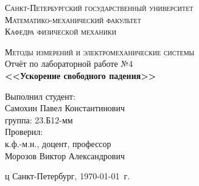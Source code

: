\begin{titlepage}
\begin{center}
\textsc{Санкт-Петербургский государственный университет\\
Математико-механический факультет\\
Кафедра физической механики\\}

\vfill

\textsc{Методы измерений и электромеханические системы\\[3mm]}
Отчёт по лабораторной работе №4\\[6mm]


\textbf{\large<<Ускорение свободного падения>>}

\vfill
\end{center}

\hfill
\begin{minipage}{.5\textwidth}
Выполнил студент:\\[2mm] 
Самохин Павел Константинович\\
группа: 23.Б12-мм\\[5mm]

Проверил:\\[2mm] 
к.ф.-м.н., доцент, профессор\\
Морозов Виктор Александрович
\end{minipage}%
\vfill
\begin{center}
ц Санкт-Петербург, \yeardate\today\ г.
\end{center}
\end{titlepage}